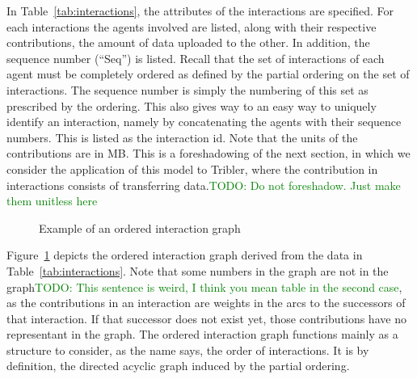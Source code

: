 \documentclass[a4paper,11pt]{book}
\newcommand\suggestion[1]{\textcolor{green}{TODO: #1}}
\theoremstyle{definition}
\begin{document}
In Table~\ref{tab:interactions}, the attributes of the interactions are specified. For each interactions the
agents involved are listed, along with their respective contributions, the amount of data uploaded
to the other. In addition, the sequence number (``Seq'') is listed. Recall that the set of interactions of each agent must
be completely ordered as defined by the partial ordering on the set of interactions. The sequence number is
simply the numbering of this set as prescribed by the ordering. This also gives way to an easy way to uniquely
identify an interaction, namely by concatenating the agents with their sequence numbers. This is listed
as the interaction id. Note that the units of the contributions are in MB. This is a foreshadowing of
the next section, in which we consider the application of this model to Tribler, where the contribution in
interactions consists of transferring data.\suggestion{Do not foreshadow. Just make them unitless here}

\begin{figure}[h]
    \centering
     \caption{Example of an ordered interaction graph}
     \label{fig:ex_oig}
\end{figure}

Figure~\ref{fig:ex_oig} depicts the ordered interaction graph derived from the data in Table~\ref{tab:interactions}.
Note that some numbers in the graph are not in the graph\suggestion{This sentence is weird, I think you mean table in
the second case}, as the contributions in an interaction are
weights in the arcs to the successors of that interaction. If that successor does not exist yet, those
contributions have no representant in the graph. The ordered interaction graph functions mainly as a 
structure to consider, as the name says, the order of interactions. It is by definition, the directed
acyclic graph induced by the partial ordering.
\end{document}

